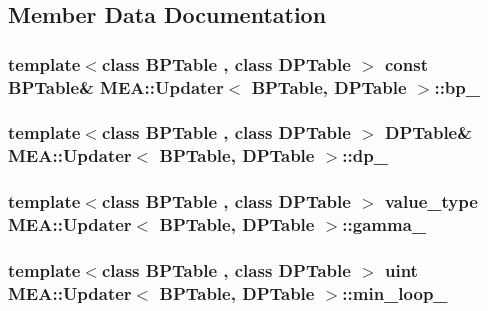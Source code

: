 \subsection{Member Data Documentation}
\hypertarget{struct_m_e_a_1_1_updater_a49f2733a73cd8c11eff32a876d026e01}{
\subsubsection[{bp\+\_\+}]{\setlength{\rightskip}{0pt plus 5cm}template$<$class B\+P\+Table , class D\+P\+Table $>$ const {\bf B\+P\+Table}\& {\bf M\+E\+A\+::\+Updater}$<$ {\bf B\+P\+Table}, D\+P\+Table $>$\+::bp\+\_\+}}\label{struct_m_e_a_1_1_updater_a49f2733a73cd8c11eff32a876d026e01}
\hypertarget{struct_m_e_a_1_1_updater_ab78089f3d41c25887c7586de0b1e1910}{
\subsubsection[{dp\+\_\+}]{\setlength{\rightskip}{0pt plus 5cm}template$<$class B\+P\+Table , class D\+P\+Table $>$ D\+P\+Table\& {\bf M\+E\+A\+::\+Updater}$<$ {\bf B\+P\+Table}, D\+P\+Table $>$\+::dp\+\_\+}}\label{struct_m_e_a_1_1_updater_ab78089f3d41c25887c7586de0b1e1910}
\hypertarget{struct_m_e_a_1_1_updater_a098bbe27695679391e12aaf0ec72d274}{
\subsubsection[{gamma\+\_\+}]{\setlength{\rightskip}{0pt plus 5cm}template$<$class B\+P\+Table , class D\+P\+Table $>$ {\bf value\+\_\+type} {\bf M\+E\+A\+::\+Updater}$<$ {\bf B\+P\+Table}, D\+P\+Table $>$\+::gamma\+\_\+}}\label{struct_m_e_a_1_1_updater_a098bbe27695679391e12aaf0ec72d274}
\hypertarget{struct_m_e_a_1_1_updater_a8831f08c5d04f9fd05d1d9dd284af641}{
\subsubsection[{min\+\_\+loop\+\_\+}]{\setlength{\rightskip}{0pt plus 5cm}template$<$class B\+P\+Table , class D\+P\+Table $>$ {\bf uint} {\bf M\+E\+A\+::\+Updater}$<$ {\bf B\+P\+Table}, D\+P\+Table $>$\+::min\+\_\+loop\+\_\+}}\label{struct_m_e_a_1_1_updater_a8831f08c5d04f9fd05d1d9dd284af641}
